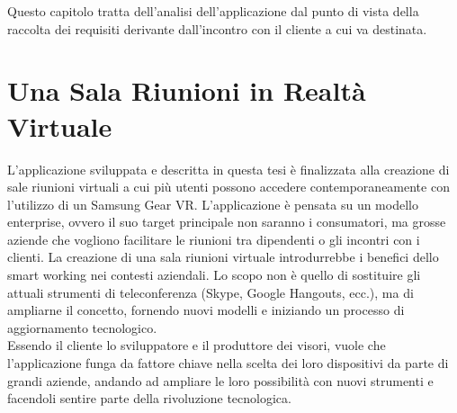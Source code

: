 Questo capitolo tratta dell'analisi dell'applicazione dal punto di vista della raccolta dei requisiti derivante dall'incontro con il cliente a cui va destinata. \\

\section{Una Sala Riunioni in Realtà Virtuale}
L'applicazione sviluppata e descritta in questa tesi è finalizzata alla creazione di sale riunioni virtuali a cui più utenti possono accedere contemporaneamente con l'utilizzo di un Samsung Gear VR. L'applicazione è pensata su un modello enterprise, ovvero il suo target principale non saranno i consumatori, ma grosse aziende che vogliono facilitare le riunioni tra dipendenti o gli incontri con i clienti. La creazione di una sala riunioni virtuale introdurrebbe i benefici dello smart working nei contesti aziendali. Lo scopo non è quello di sostituire gli attuali strumenti di teleconferenza (Skype, Google Hangouts, ecc.), ma di ampliarne il concetto, fornendo nuovi modelli e iniziando un processo di aggiornamento tecnologico.\\
Essendo il cliente lo sviluppatore e il produttore dei visori, vuole che l'applicazione funga da fattore chiave nella scelta dei loro dispositivi da parte di grandi aziende, andando ad ampliare le loro possibilità con nuovi strumenti e facendoli sentire parte della rivoluzione tecnologica. \\

